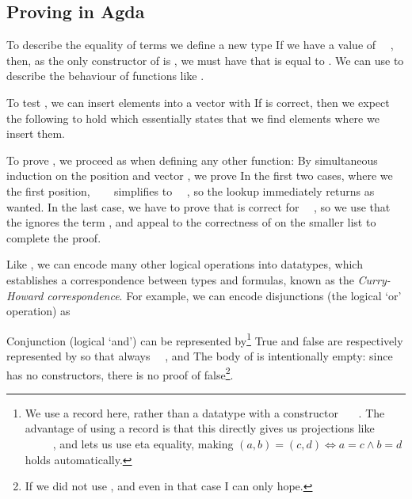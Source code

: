 \subsection{Proving in Agda}\label{sec:background-proving}
To describe the equality of terms we define a new type
If we have a value  of \ \ , then, as the only constructor of  is , we must have that  is equal to . We can use  to describe the behaviour of functions like .

To test , we can insert elements into a vector with
If  is correct, then we expect the following to hold
which essentially states that we find elements where we insert them.

To prove , we proceed as when defining any other function: By simultaneous induction on the position  and vector , we prove
In the first two cases, where we  the first position, \ \ \  simplifies to \ \ , so the lookup immediately returns  as wanted. In the last case, we have to prove that  is correct for \ \ , so we use that the  ignores the term , and appeal to the correctness of  on the smaller list  to complete the proof.

Like , we can encode many other logical operations into datatypes, which establishes a correspondence between types and formulas, known as the \emph{Curry-Howard correspondence}. For example, we can encode disjunctions (the logical `or' operation) as

Conjunction (logical `and') can be represented by\footnote{We use a record here, rather than a datatype with a constructor \ \ \ . The advantage of using a record is that this directly gives us projections like \ \AV{:}\ \ \ \ , and lets us use eta equality, making $(a, b) = (c , d) \iff a = c \land b = d$ holds automatically.}
True and false are respectively represented by
so that always \ \AV{:}\ , and 
The body of  is intentionally empty: since  has no constructors, there is no proof of false\footnote{If we did not use , and even in that case I can only hope.}.

